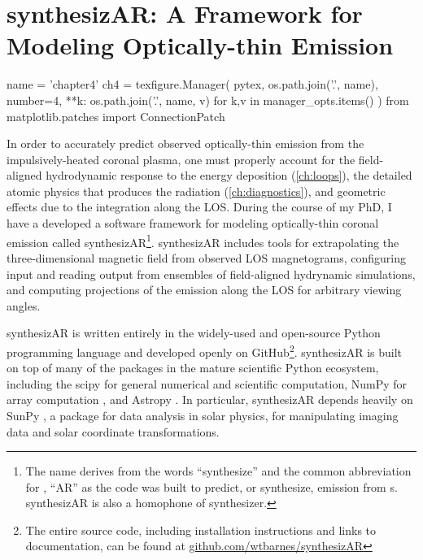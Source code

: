 \chapter{synthesizAR: A Framework for Modeling Optically-thin Emission}\label{ch:synthesizar}

\begin{pycode}[chapter4]
name = 'chapter4'
ch4 = texfigure.Manager(
    pytex,
    os.path.join('.', name),
    number=4,
    **{k: os.path.join('.', name, v) for k,v in manager_opts.items()}
)
from matplotlib.patches import ConnectionPatch
\end{pycode}

In order to accurately predict observed optically-thin emission from the impulsively-heated coronal plasma, one must properly account for the field-aligned hydrodynamic response to the energy deposition (\autoref{ch:loops}), the detailed atomic physics that produces the radiation (\autoref{ch:diagnostics}), and geometric effects due to the integration along the LOS. During the course of my PhD, I have a developed a software framework for modeling optically-thin coronal emission called synthesizAR\footnote{The name derives from the words ``synthesize'' and the common abbreviation for \AR{}, ``AR'' as the code was built to predict, or synthesize, emission from \AR s. synthesizAR is also a homophone of synthesizer.}. synthesizAR includes tools for extrapolating the three-dimensional magnetic field from observed LOS magnetograms, configuring input and reading output from ensembles of field-aligned hydrynamic simulations, and computing projections of the emission along the LOS for arbitrary viewing angles. 

synthesizAR is written entirely in the widely-used and open-source Python programming language and developed openly on GitHub\footnote{The entire source code, including installation instructions and links to documentation, can be found at \href{https://github.com/wtbarnes/synthesizAR}{github.com/wtbarnes/synthesizAR}}. synthesizAR is built on top of many of the packages in the mature scientific Python ecosystem, including the scipy \citep{jones_scipy_2001} for general numerical and scientific computation, NumPy for array computation \citep{oliphant_guide_2006}, and Astropy \citep{the_astropy_collaboration_astropy_2018}. In particular, synthesizAR depends heavily on SunPy \citep{sunpy_community_sunpypython_2015}, a package for data analysis in solar physics, for manipulating imaging data and solar coordinate transformations.

